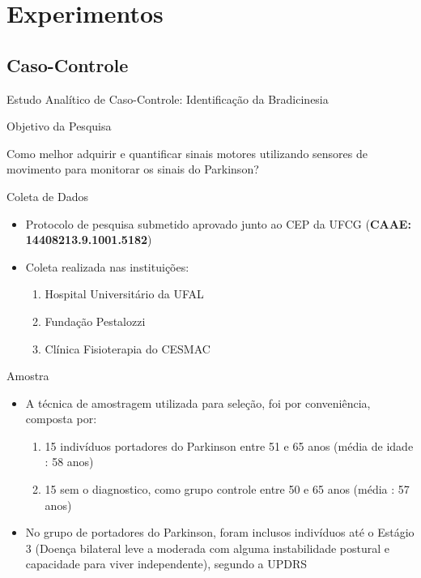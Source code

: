 \documentclass{beamer}
\begin{document}
\section{Experimentos}
\subsection{Caso-Controle}
\begin{frame}{Estudo Analítico de Caso-Controle: Identificação da Bradicinesia} 
    \begin{block}{Objetivo da Pesquisa}

    
    Como melhor adquirir e quantificar sinais motores utilizando sensores de movimento para monitorar os sinais do Parkinson?

    \end{block}
		\begin{block}{Coleta de Dados}
			\begin{itemize}
				\item Protocolo de pesquisa submetido aprovado junto ao CEP da UFCG (\textbf{CAAE: 14408213.9.1001.5182})
				\item Coleta realizada nas instituições:
					\begin{enumerate}
						\item Hospital Universitário da UFAL
						\item Fundação Pestalozzi
						\item Clínica Fisioterapia do CESMAC
				\end{enumerate}				
			\end{itemize}
    \end{block}
\end{frame}

\begin{frame}{Amostra} 
    \begin{block}{}
			\begin{itemize}
				\item A técnica de amostragem utilizada para seleção, foi por conveniência, composta por:
				\begin{enumerate}
					\item 15 indivíduos portadores do Parkinson entre 51 e 65 anos (média de idade : 58 anos)
					\item 15 sem o diagnostico, como grupo controle entre 50 e 65 anos (média : 57 anos)
				\end{enumerate}
					\item No grupo de portadores do Parkinson, foram inclusos indivíduos até o Estágio 3 (Doença bilateral leve a moderada com alguma instabilidade postural e capacidade para viver independente), segundo a UPDRS
				\end{itemize}
    \end{block}
\end{frame}
 
\end{document}
